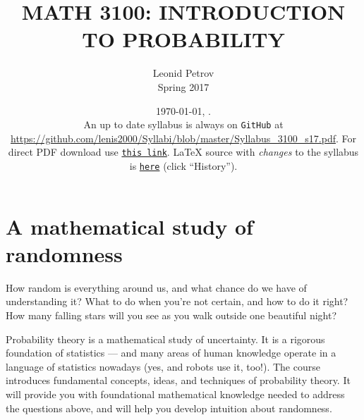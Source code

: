 \documentclass[oneside,11pt]{amsart}
\begin{document}
\title[MATH 3100: INTRODUCTION TO PROBABILITY]{MATH 3100: INTRODUCTION TO PROBABILITY}
\author{Leonid Petrov\\Spring 2017}
\date{\today, \currenttime.\\An up to date syllabus is always on \texttt{GitHub} at \url{https://github.com/lenis2000/Syllabi/blob/master/Syllabus_3100_s17.pdf}. For direct PDF download use \href{https://github.com/lenis2000/Syllabi/raw/master/Syllabus_3100_s17.pdf}{\texttt{this link}}.
	\LaTeX{} source with \textit{changes} to the syllabus is \href{https://github.com/lenis2000/Syllabi/blob/master/Syllabus_3100_s17.tex}{\texttt{here}}
(click ``History'').}
\maketitle

\bigskip

\section{A mathematical study of randomness}

How random is everything around us, and what chance do we have of understanding it? 
What to do when you're not certain, and how to do it right?
How many falling stars will you see as you walk outside one beautiful night? 

Probability theory is a mathematical study of uncertainty.
It is a rigorous foundation of statistics --- and
many areas of human knowledge operate in a language of statistics nowadays
(yes, and robots use it, too!).
The course introduces fundamental concepts, ideas, and techniques of probability theory.
It  will provide you with foundational mathematical knowledge
needed to address the questions above, and 
will help you develop
intuition about randomness.
\end{document}
